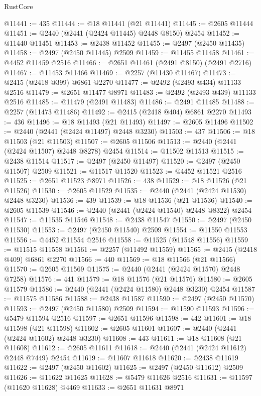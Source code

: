 \begin{lexlean}{RustCore}
\begin{coremodule}
@11441 := 435
@11444 := @18 @11441 (@21 @11441)
@11445 := @2605 @11444
@11451 := @2440 (@2441 (@2424 @11445) @2448 @8150) @2454
@11452 := @11440 @11451
@11453 := @2438 @11452
@11455 := @2497 (@2450 @11435)
@11458 := @2497 (@2450 @11445) @2509
@11459 := @11455 @11458
@11461 := @4452 @11459 @2516
@11466 := @2651 @11461 (@2491 @8150) (@2491 @2716)
@11467 := @11453 @11466
@11469 := @2257 (@11430 @11467)
@11473 := @2415 (@2418 @399) @6861 @2270
@11477 := @2492 (@2493 @434) @11133 @2516
@11479 := @2651 @11477 @8971
@11483 := @2492 (@2493 @439) @11133 @2516
@11485 := @11479 (@2491 @11483)
@11486 := @2491 @11485
@11488 := @2257 (@11473 @11486)
@11492 := @2415 (@2418 @404) @6861 @2270
@11493 := 436
@11496 := @18 @11493 (@21 @11493)
@11497 := @2605 @11496
@11502 := @2440 (@2441 (@2424 @11497) @2448 @3230)
@11503 := 437
@11506 := @18 @11503 (@21 @11503)
@11507 := @2605 @11506
@11513 := @2440 (@2441 (@2424 @11507) @2448 @8278) @2454
@11514 := @11502 @11513
@11515 := @2438 @11514
@11517 := @2497 (@2450 @11497)
@11520 := @2497 (@2450 @11507) @2509
@11521 := @11517 @11520
@11523 := @4452 @11521 @2516
@11525 := @2651 @11523 @8971
@11526 := 438
@11529 := @18 @11526 (@21 @11526)
@11530 := @2605 @11529
@11535 := @2440 (@2441 (@2424 @11530) @2448 @3230)
@11536 := 439
@11539 := @18 @11536 (@21 @11536)
@11540 := @2605 @11539
@11546 := @2440 (@2441 (@2424 @11540) @2448 @8322) @2454
@11547 := @11535 @11546
@11548 := @2438 @11547
@11550 := @2497 (@2450 @11530)
@11553 := @2497 (@2450 @11540) @2509
@11554 := @11550 @11553
@11556 := @4452 @11554 @2516
@11558 := @11525 (@11548 @11556)
@11559 := @11515 @11558
@11561 := @2257 (@11492 @11559)
@11565 := @2415 (@2418 @409) @6861 @2270
@11566 := 440
@11569 := @18 @11566 (@21 @11566)
@11570 := @2605 @11569
@11575 := @2440 (@2441 (@2424 @11570) @2448 @7258)
@11576 := 441
@11579 := @18 @11576 (@21 @11576)
@11580 := @2605 @11579
@11586 := @2440 (@2441 (@2424 @11580) @2448 @3230) @2454
@11587 := @11575 @11586
@11588 := @2438 @11587
@11590 := @2497 (@2450 @11570)
@11593 := @2497 (@2450 @11580) @2509
@11594 := @11590 @11593
@11596 := @5479 @11594 @2516
@11597 := @2651 @11596
@11598 := 442
@11601 := @18 @11598 (@21 @11598)
@11602 := @2605 @11601
@11607 := @2440 (@2441 (@2424 @11602) @2448 @3230)
@11608 := 443
@11611 := @18 @11608 (@21 @11608)
@11612 := @2605 @11611
@11618 := @2440 (@2441 (@2424 @11612) @2448 @7449) @2454
@11619 := @11607 @11618
@11620 := @2438 @11619
@11622 := @2497 (@2450 @11602)
@11625 := @2497 (@2450 @11612) @2509
@11626 := @11622 @11625
@11628 := @5479 @11626 @2516
@11631 := @11597 (@11620 @11628) @4469
@11633 := @2651 @11631 @8971

\end{coremodule}
\end{lexlean}

